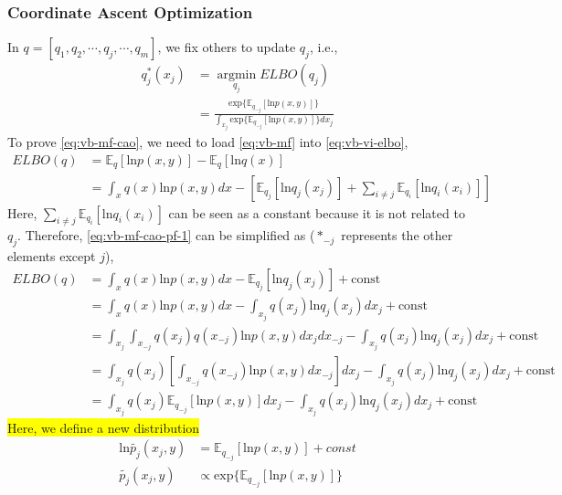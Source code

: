\documentclass{article}
\begin{document}
\subsubsection{Coordinate Ascent Optimization}
In $q = [q_1, q_2, \cdots, q_j, \cdots, q_m]$, we fix others to update $q_j$, i.e.,
\begin{equation}
\begin{split}
q_j^*(x_j) &= \mathop{\arg\min}\limits_{q_j} ELBO(q_j) \\
&= \frac{\text{exp}\{\mathbb{E}_{q_{-j}}[\text{ln}p(x,y)]\}}{\int_{x_j}\text{exp}\{\mathbb{E}_{q_{-j}}[\text{ln}p(x,y)]\}dx_j}
\end{split}
\label{eq:vb-mf-cao}
\end{equation}
To prove \eqref{eq:vb-mf-cao}, we need to load \eqref{eq:vb-mf} into \eqref{eq:vb-vi-elbo},
\begin{align}
ELBO(q) &= \mathbb{E}_q[\text{ln}p(x,y)] - \mathbb{E}_q [\text{ln} q(x)] \\
&= \int_{x}q(x)\text{ln}p(x,y)dx - \left[\mathbb{E}_{q_j} [\text{ln} q_j(x_j)] + \sum_{i\neq j}\mathbb{E}_{q_i} [\text{ln} q_i(x_i)]\right]
\label{eq:vb-mf-cao-pf-1}
\end{align}
Here, $\sum_{i\neq j}\mathbb{E}_{q_i} [\text{ln} q_i(x_i)]$ can be seen as a constant because it is not related to $q_j$. Therefore, \eqref{eq:vb-mf-cao-pf-1} can be simplified as ($*_{-j}$ represents the other elements except $j$),
\begin{align}
ELBO(q) &= \int_{x}q(x)\text{ln}p(x,y)dx - \mathbb{E}_{q_j} [\text{ln} q_j(x_j)] + \text{const}\\
&=\int_{x}q(x)\text{ln}p(x,y)dx - \int_{x_j}q(x_j)\text{ln} q_j(x_j)dx_j + \text{const}\\
&=\int_{x_j}\int_{x_{-j}}q(x_j)q(x_{-j})\text{ln}p(x,y)dx_jdx_{-j} - \int_{x_j}q(x_j)\text{ln} q_j(x_j)dx_j + \text{const} \\
&= \int_{x_j}q(x_j)\left[\int_{x_{-j}}q(x_{-j})\text{ln}p(x,y)dx_{-j}\right]dx_j - \int_{x_j}q(x_j)\text{ln} q_j(x_j)dx_j + \text{const} \\
&= \int_{x_j}q(x_j)\mathbb{E}_{q_{-j}}[\text{ln}p(x,y)]dx_j - \int_{x_j}q(x_j)\text{ln} q_j(x_j)dx_j + \text{const}
\label{eq:vb-mf-cao-pf-2}
\end{align}
\colorbox{yellow}{Here, we define a new distribution}
\begin{equation}
\begin{split}
\text{ln}\tilde{p_j}(x_j,y) &= \mathbb{E}_{q_{-j}}[\text{ln}p(x,y)] + const \\
\tilde{p_j}(x_j,y) &\propto \text{exp}\{\mathbb{E}_{q_{-j}}[\text{ln}p(x,y)]\}
\end{split}
\label{eq:vb-mf-cao-pf-dist}
\end{equation}
\end{document}
